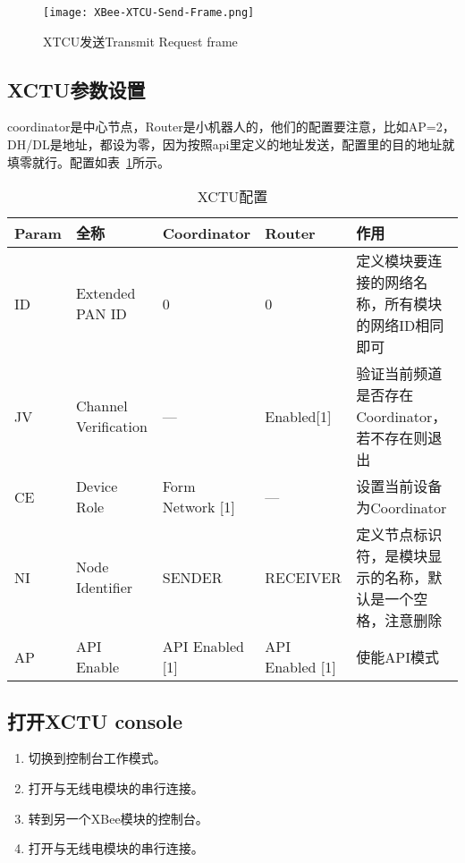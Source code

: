 \begin{figure}[htbp]
    \centering
    \texttt{[image: XBee-XTCU-Send-Frame.png]}
    \caption{XTCU发送Transmit Request frame}
    \label{fig:XBee-XTCU-Send-Frame}
\end{figure}


\subsection{XCTU参数设置}

coordinator是中心节点，Router是小机器人的，他们的配置要注意，比如AP=2，DH/DL是地址，都设为零，因为按照api里定义的地址发送，配置里的目的地址就填零就行。配置如表~\ref{tab:XCTU}所示。

\begin{table}[htbp]
    \centering
    \begin{tabular}{@{}lllll@{}}
    \toprule
    Param  & 全称  & Coordinator & Router & 作用 \\ \midrule
    ID &  Extended PAN ID      &  0                    & 0                   & 定义模块要连接的网络名称，所有模块的网络ID相同即可 \\
    JV &  Channel Verification &  —                    & Enabled{[}1{]}      & 验证当前频道是否存在Coordinator，若不存在则退出 \\
    CE &  Device Role          &  Form Network {[}1{]} & —                   & 设置当前设备为Coordinator \\
    NI &  Node Identifier      &  SENDER               & RECEIVER            & 定义节点标识符，是模块显示的名称，默认是一个空格，注意删除 \\
    AP &  API Enable           &  API Enabled {[}1{]}  & API Enabled {[}1{]} & 使能API模式 \\ \bottomrule
    \end{tabular}
    \caption{XCTU配置}
    \label{tab:XCTU}
\end{table}

\subsection{打开XCTU console}

\begin{enumerate}
    \item 切换到控制台工作模式。
    \item 打开与无线电模块的串行连接。
    \item 转到另一个XBee模块的控制台。
    \item 打开与无线电模块的串行连接。
\end{enumerate}

